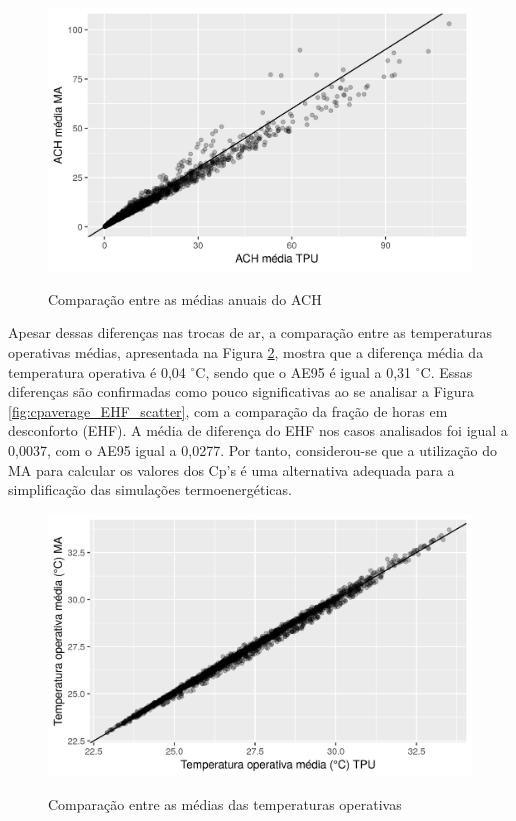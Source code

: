\documentclass[brazil,hardcopy,openany,a4paper]{ufscthesis}
\begin{document}
		\begin{figure}[H]
			\centering
			\caption{Comparação entre as médias anuais do ACH}
			\includegraphics[width=1\linewidth]{img/cpaverage_ACH_scatter.png}
			\label{fig:cpaverage_ACH_scatter}
		\end{figure}
		
		Apesar dessas diferenças nas trocas de ar, a comparação entre as temperaturas operativas médias, apresentada na Figura \ref{fig:cpaverage_temp_scatter}, mostra que a diferença média da temperatura operativa é 0,04 $^{\circ}$C, sendo que o AE95 é igual a 0,31 $^{\circ}$C.
		Essas diferenças são confirmadas como pouco significativas ao se analisar a Figura \ref{fig:cpaverage_EHF_scatter}, com a comparação da fração de horas em desconforto (EHF). A média de diferença do EHF nos casos analisados foi igual a 0,0037, com o AE95 igual a 0,0277.
		Por tanto, considerou-se que a utilização do MA para calcular os valores dos Cp's é uma alternativa adequada para a simplificação das simulações termoenergéticas.
		
		\begin{figure}[H]
			\centering
			\caption{Comparação entre as médias das temperaturas operativas}
			\includegraphics[width=1\linewidth]{img/cpaverage_temp_scatter.png}
			\label{fig:cpaverage_temp_scatter}
		\end{figure}
	
\end{document}
